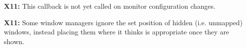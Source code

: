 
\begin{DoxyRefList}
\item[\label{bug__bug000001}%
\hypertarget{bug__bug000001}{}%
Member \hyperlink{group__monitor_gacfa9978e57c73670577d530df23bf275}{glfw\-Set\-Monitor\-Callback} (G\-L\-F\-Wmonitorfun cbfun)]{\bfseries X11\-:} This callback is not yet called on monitor configuration changes. 
\item[\label{bug__bug000002}%
\hypertarget{bug__bug000002}{}%
Member \hyperlink{group__window_ga0dc8d880a0d87be16d3ea8114561f6f0}{glfw\-Set\-Window\-Pos} (G\-L\-F\-Wwindow $\ast$window, int xpos, int ypos)]{\bfseries X11\-:} Some window managers ignore the set position of hidden (i.\-e. unmapped) windows, instead placing them where it thinks is appropriate once they are shown.
\end{DoxyRefList}